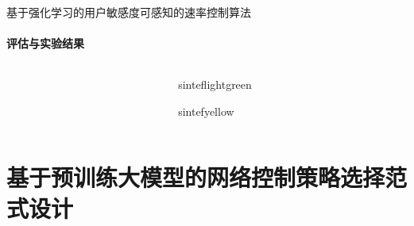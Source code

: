\documentclass{beamer}
\begin{document}
\begin{frame}[fragile]{基于强化学习的用户敏感度可感知的速率控制算法}
\framesubtitle{评估与实验结果}
        \begin{columns}
            \begin{column}{0.45\textwidth}
            \begin{block}{}

            \end{block}
    
            \end{column}
    
            \begin{column}{0.5\textwidth}
            \begin{colorblock}[black]{sinteflightgreen}{}
                
            
            \end{colorblock}
            
            \begin{colorblock}[black]{sintefyellow}{}
                                \begin{table}[ht]
            \centering
            \caption{敏感度误分类对QoE的影响}
            \renewcommand\arraystretch{1.25}
            \label{miscals}
            \end{table}
            \end{colorblock}

        \end{column}
    \end{columns}
\end{frame}
\section{基于预训练大模型的网络控制策略选择范式设计}
\end{document}
